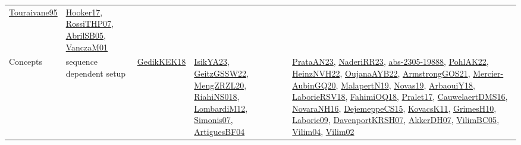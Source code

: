 {\begin{longtable}{lp{3cm}>{\raggedright}p{6cm}>{\raggedright}p{6cm}p{8cm}}
\href{papers/Touraivane95.pdf}{Touraivane95}\cite{Touraivane95} & \href{papers/Hooker17.pdf}{Hooker17}\cite{Hooker17}, \href{papers/RossiTHP07.pdf}{RossiTHP07}\cite{RossiTHP07}, \href{papers/AbrilSB05.pdf}{AbrilSB05}\cite{AbrilSB05}, \href{papers/VanczaM01.pdf}{VanczaM01}\cite{VanczaM01}\\
Concepts & sequence dependent setup & \href{articles/GedikKEK18.pdf}{GedikKEK18}\cite{GedikKEK18} & \href{articles/IsikYA23.pdf}{IsikYA23}\cite{IsikYA23}, \href{papers/GeitzGSSW22.pdf}{GeitzGSSW22}\cite{GeitzGSSW22}, \href{articles/MengZRZL20.pdf}{MengZRZL20}\cite{MengZRZL20}, \href{papers/RiahiNS018.pdf}{RiahiNS018}\cite{RiahiNS018}, \href{articles/LombardiM12.pdf}{LombardiM12}\cite{LombardiM12}, \href{articles/Simonis07.pdf}{Simonis07}\cite{Simonis07}, \href{papers/ArtiguesBF04.pdf}{ArtiguesBF04}\cite{ArtiguesBF04} & \href{articles/PrataAN23.pdf}{PrataAN23}\cite{PrataAN23}, \href{articles/NaderiRR23.pdf}{NaderiRR23}\cite{NaderiRR23}, \href{articles/abs-2305-19888.pdf}{abs-2305-19888}\cite{abs-2305-19888}, \href{articles/PohlAK22.pdf}{PohlAK22}\cite{PohlAK22}, \href{articles/HeinzNVH22.pdf}{HeinzNVH22}\cite{HeinzNVH22}, \href{papers/OujanaAYB22.pdf}{OujanaAYB22}\cite{OujanaAYB22}, \href{papers/ArmstrongGOS21.pdf}{ArmstrongGOS21}\cite{ArmstrongGOS21}, \href{papers/Mercier-AubinGQ20.pdf}{Mercier-AubinGQ20}\cite{Mercier-AubinGQ20}, \href{papers/MalapertN19.pdf}{MalapertN19}\cite{MalapertN19}, \href{articles/Novas19.pdf}{Novas19}\cite{Novas19}, \href{papers/ArbaouiY18.pdf}{ArbaouiY18}\cite{ArbaouiY18}, \href{articles/LaborieRSV18.pdf}{LaborieRSV18}\cite{LaborieRSV18}, \href{articles/FahimiOQ18.pdf}{FahimiOQ18}\cite{FahimiOQ18}, \href{papers/Pralet17.pdf}{Pralet17}\cite{Pralet17}, \href{papers/CauwelaertDMS16.pdf}{CauwelaertDMS16}\cite{CauwelaertDMS16}, \href{articles/NovaraNH16.pdf}{NovaraNH16}\cite{NovaraNH16}, \href{papers/DejemeppeCS15.pdf}{DejemeppeCS15}\cite{DejemeppeCS15}, \href{articles/KovacsK11.pdf}{KovacsK11}\cite{KovacsK11}, \href{papers/GrimesH10.pdf}{GrimesH10}\cite{GrimesH10}, \href{papers/Laborie09.pdf}{Laborie09}\cite{Laborie09}, \href{papers/DavenportKRSH07.pdf}{DavenportKRSH07}\cite{DavenportKRSH07}, \href{papers/AkkerDH07.pdf}{AkkerDH07}\cite{AkkerDH07}, \href{articles/VilimBC05.pdf}{VilimBC05}\cite{VilimBC05}, \href{papers/Vilim04.pdf}{Vilim04}\cite{Vilim04}, \href{papers/Vilim02.pdf}{Vilim02}\cite{Vilim02}\\

\end{longtable}}
